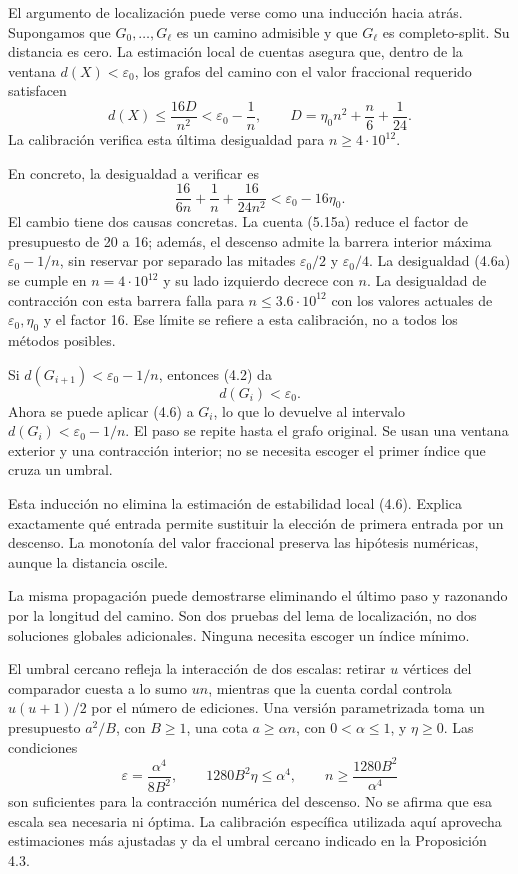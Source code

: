 \documentclass[spanish,11pt,a4paper]{article}
\begin{document}
El argumento de localización puede verse como una inducción hacia atrás. Supongamos que \(G_0,\ldots,G_\ell\) es un camino admisible y que \(G_\ell\) es completo-split. Su distancia es cero. La estimación local de cuentas asegura que, dentro de la ventana \(d(X)<\varepsilon_0\), los grafos del camino con el valor fraccional requerido satisfacen \[
d(X)\le\frac{16D}{n^2}<\varepsilon_0-\frac1n,\qquad
D=\eta_0n^2+\frac n6+\frac1{24}.
\tag{4.6}
\] La calibración verifica esta última desigualdad para \(n\ge4\cdot10^{12}\).

En concreto, la desigualdad a verificar es \[
\frac{16}{6n}+\frac1n+\frac{16}{24n^2}
<\varepsilon_0-16\eta_0.
\tag{4.6a}
\] El cambio tiene dos causas concretas. La cuenta (5.15a) reduce el factor de presupuesto de 20 a 16; además, el descenso admite la barrera interior máxima \(\varepsilon_0-1/n\), sin reservar por separado las mitades \(\varepsilon_0/2\) y \(\varepsilon_0/4\). La desigualdad (4.6a) se cumple en \(n=4\cdot10^{12}\) y su lado izquierdo decrece con \(n\). La desigualdad de contracción con esta barrera falla para \(n\le3.6\cdot10^{12}\) con los valores actuales de \(\varepsilon_0,\eta_0\) y el factor 16. Ese límite se refiere a esta calibración, no a todos los métodos posibles.

Si \(d(G_{i+1})<\varepsilon_0-1/n\), entonces (4.2) da \[
d(G_i)<\varepsilon_0.
\] Ahora se puede aplicar (4.6) a \(G_i\), lo que lo devuelve al intervalo \(d(G_i)<\varepsilon_0-1/n\). El paso se repite hasta el grafo original. Se usan una ventana exterior y una contracción interior; no se necesita escoger el primer índice que cruza un umbral.

Esta inducción no elimina la estimación de estabilidad local (4.6). Explica exactamente qué entrada permite sustituir la elección de primera entrada por un descenso. La monotonía del valor fraccional preserva las hipótesis numéricas, aunque la distancia oscile.

La misma propagación puede demostrarse eliminando el último paso y razonando por la longitud del camino. Son dos pruebas del lema de localización, no dos soluciones globales adicionales. Ninguna necesita escoger un índice mínimo.

El umbral cercano refleja la interacción de dos escalas: retirar \(u\) vértices del comparador cuesta a lo sumo \(un\), mientras que la cuenta cordal controla \(u(u+1)/2\) por el número de ediciones. Una versión parametrizada toma un presupuesto \(a^2/B\), con \(B\ge1\), una cota \(a\ge\alpha n\), con \(0<\alpha\le1\), y \(\eta\ge0\). Las condiciones \[
\varepsilon=\frac{\alpha^4}{8B^2},\qquad
1280B^2\eta\le\alpha^4,\qquad
n\ge\frac{1280B^2}{\alpha^4}
\] son suficientes para la contracción numérica del descenso. No se afirma que esa escala sea necesaria ni óptima. La calibración específica utilizada aquí aprovecha estimaciones más ajustadas y da el umbral cercano indicado en la Proposición 4.3.
\end{document}
